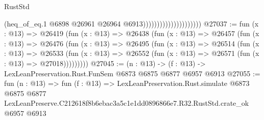 \begin{lexlean}{RustStd}
\begin{coremodule}
                                            (heq_of_eq.{1}
                                              @6898
                                              @26961
                                              @26964
                                              @6913)))))))))))))))))))))
@27037 := fun (x : @13) =>
  @26419
    (fun (x : @13) =>
    @26438
      (fun (x : @13) =>
      @26457
        (fun (x : @13) =>
        @26476
          (fun (x : @13) =>
          @26495
            (fun (x : @13) =>
            @26514
              (fun (x : @13) =>
              @26533
                (fun (x : @13) => @26552 (fun (x : @13) => @26571 (fun (x : @13) => @27018)))))))))
@27045 := (n : @13) -> (f : @13) -> LexLeanPreservation.Rust.FunSem @6873 @6875 @6877 @6957 @6913
@27055 := fun (n : @13) =>
  fun (f : @13) =>
  LexLeanPreservation.Rust.simulate
    @6873
    @6875
    @6877
    LexLeanPreserve.C212618f8b6ebac3a5c1e1dd0896866e7.R32.RustStd.crate_ok
    @6957
    @6913
\end{coremodule}
\end{lexlean}
